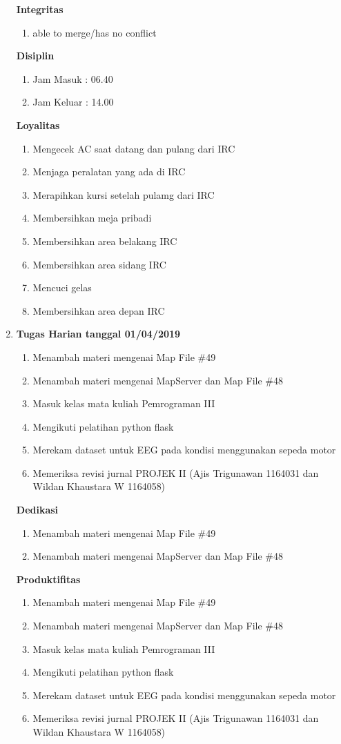 \begin{enumerate}
\textbf{Integritas}
\begin{enumerate}
\item able to merge/has no conflict
\end{enumerate}

\textbf{Disiplin}
\begin{enumerate}
\item Jam Masuk : 06.40
\item Jam Keluar : 14.00
\end{enumerate}

\textbf{Loyalitas}
\begin{enumerate}
\item Mengecek AC saat datang dan pulang dari IRC
\item Menjaga peralatan yang ada di IRC
\item Merapihkan kursi setelah pulamg dari IRC
\item Membersihkan meja pribadi
\item Membersihkan area belakang IRC
\item Membersihkan area sidang IRC
\item Mencuci gelas
\item Membersihkan area depan IRC
\end{enumerate}

\item \textbf{Tugas Harian tanggal 01/04/2019}
\begin{enumerate}
\item Menambah materi mengenai Map File \#49
\item Menambah materi mengenai MapServer dan Map File \#48
\item Masuk kelas mata kuliah Pemrograman III
\item Mengikuti pelatihan python flask
\item Merekam dataset untuk EEG pada kondisi menggunakan sepeda motor
\item Memeriksa revisi jurnal PROJEK II (Ajis Trigunawan 1164031 dan Wildan Khaustara W 1164058)
\end{enumerate}

\textbf{Dedikasi}
\begin{enumerate}
\item Menambah materi mengenai Map File \#49
\item Menambah materi mengenai MapServer dan Map File \#48
\end{enumerate}

\textbf{Produktifitas}
\begin{enumerate}
\item Menambah materi mengenai Map File \#49
\item Menambah materi mengenai MapServer dan Map File \#48
\item Masuk kelas mata kuliah Pemrograman III
\item Mengikuti pelatihan python flask
\item Merekam dataset untuk EEG pada kondisi menggunakan sepeda motor
\item Memeriksa revisi jurnal PROJEK II (Ajis Trigunawan 1164031 dan Wildan Khaustara W 1164058)
\end{enumerate}


\end{enumerate}
